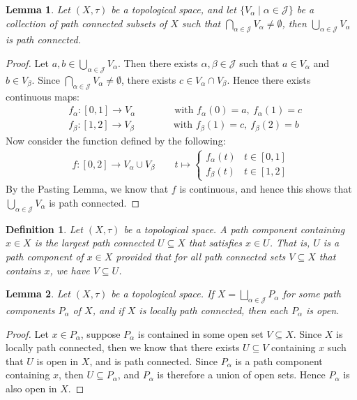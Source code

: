 \documentclass[11pt]{book}
\theoremstyle{break}
\theoremstyle{break}
\newtheorem{lem}{Lemma}[thm]
\newtheorem{defn}{Definition}[corL]
\begin{document}
\begin{lem}
Let $(X,\tau)$ be a topological space, and let $\{V_\alpha \mid \alpha \in \mathcal{J}\}$ be a collection of path connected subsets of $X$ such that $\bigcap_{\alpha \in \mathcal{J}}V_\alpha \neq \emptyset$, then $\bigcup_{\alpha \in \mathcal{J}}V_\alpha$ is path connected.
\end{lem}
\begin{proof}
Let $a,b \in \bigcup_{\alpha \in \mathcal{J}}V_\alpha$. Then there exists $\alpha,\beta \in \mathcal{J}$ such that $a \in V_\alpha$ and $b \in V_\beta$. Since $\bigcap_{\alpha\in \mathcal{J}}V_\alpha \neq \emptyset$, there exists $c \in V_\alpha \cap V_\beta$. Hence there exists continuous maps:
\begin{align*}
&f_\alpha :[0,1] \to V_\alpha \qquad\qquad \text{with }f_\alpha(0) = a, \ f_\alpha(1) = c \\
&f_\beta :[1,2] \to V_\beta \qquad\qquad \text{with }f_\beta(1) = c, \ f_\beta(2) = b 
\end{align*}
Now consider the function defined by the following:
\begin{align*}
f:[0,2] \to V_\alpha \cup V_\beta\qquad t\mapsto \begin{cases} 
f_\alpha(t) & t \in [0,1]\\
f_\beta(t) & t\in [1,2]
\end{cases}
\end{align*}
By the Pasting Lemma, we know that $f$ is continuous, and hence this shows that $\bigcup_{\alpha \in \mathcal{J}}V_\alpha$ is path connected. 
\end{proof}

\begin{defn}
Let $(X,\tau)$ be a topological space. A path component containing $x \in X$ is the largest path connected $U \subseteq X$ that satisfies $x \in U$. That is, $U$ is a path component of $x \in X$ provided that for all path connected sets $V \subseteq X$ that contains $x$, we have $V\subseteq U$.
\end{defn}

\begin{lem}
Let $(X,\tau)$ be a topological space. If $X = \bigsqcup_{\alpha \in \mathcal{J}}P_\alpha$ for some path components $P_\alpha$ of $X$, and if $X$ is locally path connected, then each $P_\alpha$ is open.
\end{lem}
\begin{proof}
Let $x \in P_\alpha$, suppose $P_\alpha$ is contained in some open set $V \subseteq X$. Since $X$ is locally path connected, then we know that there exists $U\subseteq V$ containing $x$ such that $U$ is open in $X$, and is path connected. Since $P_\alpha $ is a path component containing $x$, then $U\subseteq P_\alpha$, and $P_\alpha$ is therefore a union of open sets. Hence $P_\alpha $ is also open in $X$. 
\end{proof}
\end{document}
